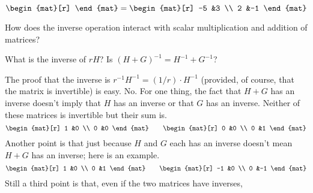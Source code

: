 \begin{exercises}
\begin{answer}
\begin{equation*}
\begin{mat}[r]
         \end{mat}
         =\begin{mat}[r]
           -5  &3  \\
            2  &-1
         \end{mat}
       \end{equation*}  
      \end{answer}
  \item 
   How does the inverse operation interact with scalar multiplication 
   and addition of matrices? 
   \begin{exparts}
      \partsitem What is the inverse of \( rH \)?
      \partsitem Is \( (H+G)^{-1}=H^{-1}+G^{-1} \)?
    \end{exparts}
    \begin{answer}
      \begin{exparts}
        \partsitem The proof that the inverse is 
          \( r^{-1}H^{-1}=(1/r)\cdot H^{-1} \) 
          (provided, of course, that the matrix is invertible) is easy.
        \partsitem No.
          For one thing, the fact that $H+G$ has an inverse doesn't imply that
          $H$ has an inverse or that $G$ has an inverse.
          Neither of these matrices is invertible but their sum is.
          \begin{equation*}
            \begin{mat}[r]
              1  &0  \\
              0  &0
            \end{mat}
            \qquad
            \begin{mat}[r]
              0  &0  \\
              0  &1
            \end{mat}
          \end{equation*}
          Another point is that just because $H$ and $G$ each has an inverse
          doesn't mean $H+G$ has an inverse; here is an example.
          \begin{equation*}
            \begin{mat}[r]
              1  &0  \\
              0  &1
            \end{mat}
            \qquad
            \begin{mat}[r]
              -1  &0  \\
               0  &-1
            \end{mat}
          \end{equation*}
          Still a third point is that, even if the two matrices have inverses,

\end{exparts}
\end{answer}
\end{exercises}
